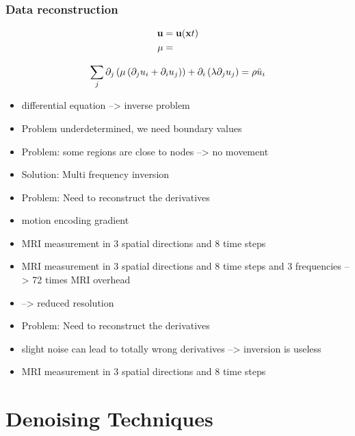 \begin{frame}		\frametitle{Data reconstruction}


\begin{align}
 \mathbf{u} &= \mathbf{u}(\xb,t) \\
 \mu &=
\end{align}


\begin{equation}
 \sum_ j \partial_j \kl{ \mu \kl{ \partial_j u_i + \partial_i u_j}} + \partial_i \kl{\lambda \partial_j u_j} = \rho \ddot{u}_i
\end{equation}


\begin{itemize}
 \item differential equation --> inverse problem
 \item Problem underdetermined, we need boundary values
 \item Problem: some regions are close to nodes --> no movement
 \item Solution: Multi frequency inversion
 \item Problem: Need to reconstruct the derivatives
 \item motion encoding gradient
 \item MRI measurement in 3 spatial directions and 8 time steps
\end{itemize}

\begin{itemize}
 \item MRI measurement in 3 spatial directions and 8 time steps and 3 frequencies --> 72 times MRI overhead
 \item --> reduced resolution
\end{itemize}

\begin{itemize}

 \item Problem: Need to reconstruct the derivatives
 \item slight noise can lead to totally wrong derivatives --> inversion is useless
 \item MRI measurement in 3 spatial directions and 8 time steps
\end{itemize}

\end{frame}

\section{Denoising Techniques}



